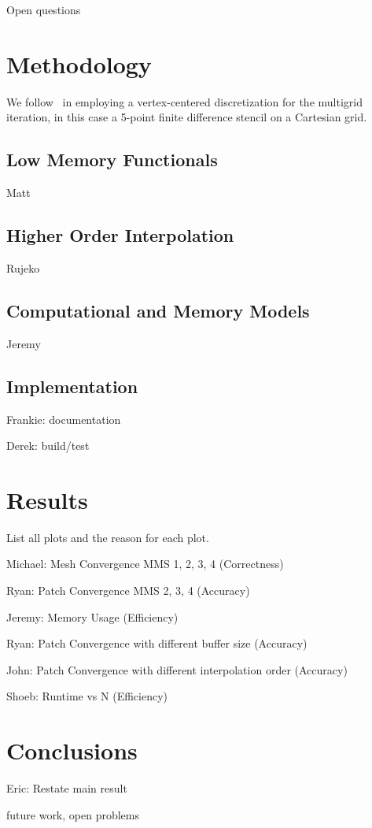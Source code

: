 Open questions

\section{Methodology}

We follow~\cite{BrandtDiskin1994} in employing a vertex-centered discretization for the multigrid iteration, in this
case a 5-point finite difference stencil on a Cartesian grid.

\subsection{Low Memory Functionals}

Matt

\subsection{Higher Order Interpolation}

Rujeko

\subsection{Computational and Memory Models}

Jeremy

\subsection{Implementation}

Frankie: documentation

Derek: build/test

\section{Results}

List all plots and the reason for each plot.

Michael: Mesh Convergence MMS 1, 2, 3, 4 (Correctness)

Ryan: Patch Convergence MMS 2, 3, 4 (Accuracy)

Jeremy: Memory Usage (Efficiency)

Ryan: Patch Convergence with different buffer size (Accuracy)

John: Patch Convergence with different interpolation order (Accuracy)

Shoeb: Runtime vs N (Efficiency)

\section{Conclusions}

Eric: Restate main result

future work, open problems
